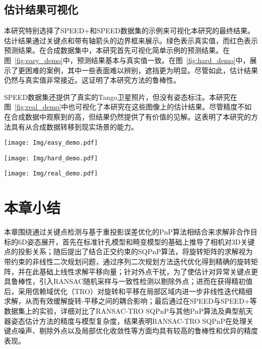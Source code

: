 \subsection{估计结果可视化}

本研究特别选择了SPEED+和SPEED数据集的示例来可视化本研究的最终结果。估计结果通过关键点和带有轴箭头的边界框来展示。绿色表示真实值，而红色表示预测结果。在合成数据集中，本研究首先可视化简单示例的预测结果。在图~\ref{fig:easy_demo}中，预测结果基本与真实值一致。在图~\ref{fig:hard_demo}中，展示了更困难的案例，其中一些表面难以辨别，遮挡更为明显。尽管如此，估计结果仍然与真实值非常接近。这证明了本研究方法的鲁棒性。

SPEED数据集还提供了真实的Tango卫星照片，但没有姿态标注。本研究在图~\ref{fig:real_demo}中也可视化了本研究在这些图像上的估计结果。尽管精度不如在合成数据中观察到的高，但结果仍然提供了有价值的见解。这表明了本研究的方法具有从合成数据转移到现实场景的能力。

\begin{figure*}[!t] \centering \texttt{[image: Img/easy\_demo.pdf]} \caption{SPEED+合成图像估计结果可视化的简单示例} \label{fig:easy_demo} \end{figure*}

\begin{figure*}[!t] \centering \texttt{[image: Img/hard\_demo.pdf]} \caption{SPEED+合成图像估计结果可视化的困难示例} \label{fig:hard_demo} \end{figure*}

\begin{figure*}[htbp] \centering \texttt{[image: Img/real\_demo.pdf]} \caption{在SPEED真实图像上的6D估计结果的实际示例} \label{fig:real_demo} \end{figure*}


\section{本章小结}
\label{sec:RANSAC-TRO-SQPnP:summary}
本章围绕通过关键点检测与基于重投影误差优化的PnP算法相结合来求解非合作目标的6D姿态展开，首先在标准针孔模型和畸变模型的基础上推导了相机对3D关键点的投影关系；随后提出了结合正交约束的SQPnP算法，将旋转矩阵的求解视为带约束的非线性二次规划问题，通过序列二次规划方法迭代优化得到精确的旋转矩阵，并在此基础上线性求解平移向量；针对外点干扰，为了使估计对异常关键点更具鲁棒性，引入RANSAC随机采样与一致性检测以剔除外点；进而在获得精初值后，采用信赖域优化（TRO）对旋转和平移在局部区域内进一步非线性迭代精细求解，从而有效缓解旋转-平移之间的耦合影响；最后通过在SPEED与SPEED+等数据集上的实验，详细对比了RANSAC-TRO SQPnP与其他PnP算法及典型航天器姿态估计方法的精度与模型复杂度，结果表明RANSAC-TRO SQPnP在处理关键点噪声、剔除外点以及局部优化收敛性等方面均具有较高的鲁棒性和优异的精度表现。